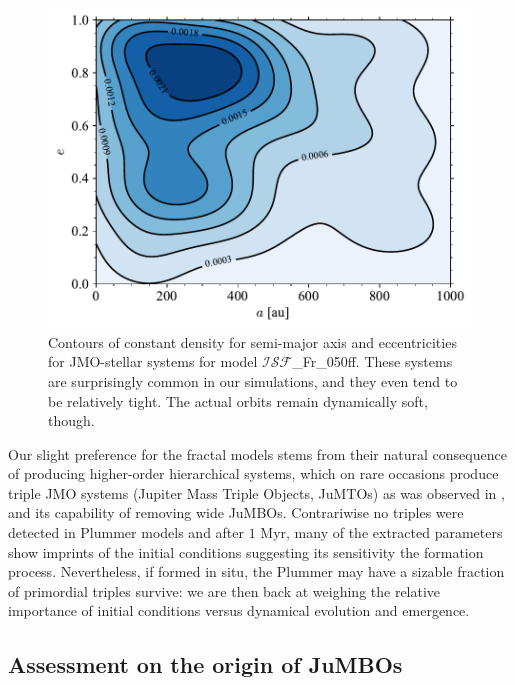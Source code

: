 \documentclass[submission,phys]{lib/SciPost}
\newcommand{\jumbos}{\mbox{JuMBOs}}
\begin{document}
   \begin{figure}
    \centering
    \includegraphics[width=0.75\columnwidth]{figures/Fractal_rvir0.5_FF_sem_ecc_mixed_systs.pdf}
    \caption{Contours of constant density for semi-major axis and
      eccentricities for JMO-stellar systems for model
      $\mathcal{ISF}$\_Fr\_050ff. These systems are surprisingly common in
      our simulations, and they even tend to be relatively tight. The
      actual orbits remain dynamically soft, though. }
         \label{Fig:MixedSys_OrbParams}
   \end{figure}

Our slight preference for the fractal models stems from their natural
consequence of producing higher-order hierarchical systems, which on
rare occasions produce triple JMO systems (Jupiter Mass Triple
Objects, JuMTOs) as was observed in \cite{2023arXiv231001231P}, and
its capability of removing wide \jumbos.  Contrariwise no triples were
detected in Plummer models and after $1$ Myr, many of the extracted
parameters show imprints of the initial conditions suggesting its
sensitivity the formation process.  Nevertheless, if formed in situ,
the Plummer may have a sizable fraction of primordial triples survive:
we are then back at weighing the relative importance of initial
conditions versus dynamical evolution and emergence.



\subsection{Assessment on the origin of \jumbos}
\end{document}
